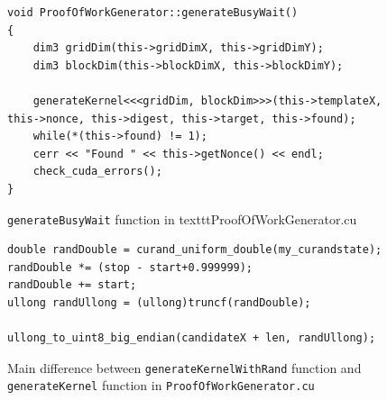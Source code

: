 \documentclass[a4paper]{article}
\begin{document}
\begin{figure}
\begin{lstlisting}
void ProofOfWorkGenerator::generateBusyWait()
{
    dim3 gridDim(this->gridDimX, this->gridDimY);
    dim3 blockDim(this->blockDimX, this->blockDimY);

    generateKernel<<<gridDim, blockDim>>>(this->templateX, this->nonce, this->digest, this->target, this->found);
    while(*(this->found) != 1);
    cerr << "Found " << this->getNonce() << endl;
    check_cuda_errors();
}
\end{lstlisting}
\caption{\label{fig:generateBusyWait} \texttt{generateBusyWait} function in texttt{ProofOfWorkGenerator.cu}}
\end{figure}

\begin{figure}
\begin{lstlisting}
double randDouble = curand_uniform_double(my_curandstate);
randDouble *= (stop - start+0.999999);
randDouble += start;
ullong randUllong = (ullong)truncf(randDouble);

ullong_to_uint8_big_endian(candidateX + len, randUllong);
\end{lstlisting}
\caption{\label{fig:generateKernelWithRand} Main difference between \texttt{generateKernelWithRand} function and \texttt{generateKernel} function in \texttt{ProofOfWorkGenerator.cu}}
\end{figure}
\end{document}
